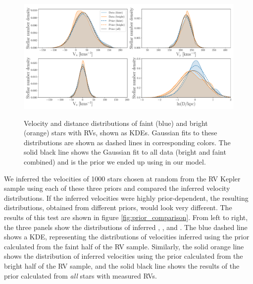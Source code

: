 \begin{figure}[ht!]
\caption{
    Velocity and distance distributions of faint (blue) and bright (orange)
    stars with RVs, shown as KDEs.
    Gaussian fits to these distributions are shown as dashed lines in
    corresponding colors.
    The solid black line shows the Gaussian fit to all data (bright and faint
    combined) and is the prior we ended up using in our model.
}
  \centering
    \includegraphics[width=1\textwidth]{prior_distributions}
\label{fig:prior_distributions}
\end{figure}
We inferred the velocities of 1000 stars chosen at random from the
RV Kepler sample using each of these three priors and compared the
inferred velocity distributions.
If the inferred velocities were highly prior-dependent, the resulting
distributions, obtained from different priors, would look very different.
The results of this test are shown in figure \ref{fig:prior_comparison}.
From left to right, the three panels show the distributions of inferred \vx,
\vy, and \vz.
The blue dashed line shows a KDE, representing the distributions of velocities
inferred using the prior calculated from the faint half of the RV sample.
Similarly, the solid orange line shows the distribution of inferred velocities
using the prior calculated from the bright half of the RV sample, and the
solid black line shows the results of the prior calculated from {\it all}
stars with measured RVs.

